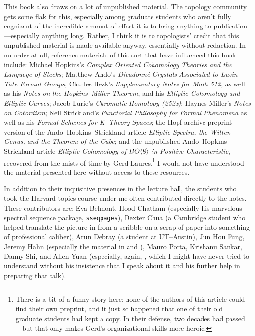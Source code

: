 This book also draws on a lot of unpublished material.  The topology community gets some flak for this, especially among graduate students who aren't fully cognizant of the incredible amount of effort it is to bring anything to publication---especially anything long.  Rather, I think it is to topologists' credit that this unpublished material is made available anyway, essentially without redaction.  In no order at all, reference materials of this sort that have influenced this book include: Michael Hopkins's \textit{Complex Oriented Cohomology Theories and the Language of Stacks}; Matthew Ando's \textit{Dieudonn\'e Crystals Associated to Lubin--Tate Formal Groups}; Charles Rezk's \textit{Supplementary Notes for Math 512}, as well as his \textit{Notes on the Hopkins--Miller Theorem}, and his \textit{Elliptic Cohomology and Elliptic Curves}; Jacob Lurie's \textit{Chromatic Homotopy (252x)}; Haynes Miller's \textit{Notes on Cobordism}; Neil Strickland's \textit{Functorial Philosophy for Formal Phenomena} as well as his \textit{Formal Schemes for $K$--Theory Spaces}; the Hopf archive preprint version of the Ando--Hopkins--Strickland article \textit{Elliptic Spectra, the Witten Genus, and the Theorem of the Cube}; and the unpublished Ando--Hopkins--Strickland article \textit{Elliptic Cohomology of $BO\langle8\rangle$ in Positive Characteristic}, recovered from the mists of time by Gerd Laures.\footnote{There is a bit of a funny story here: none of the authors of this article could find their own preprint, and it just so happened that one of their old graduate students had kept a copy.  In their defense, two decades had passed---but that only makes Gerd's organizational skills more heroic.}  I would not have understood the material presented here without access to these resources.

In addition to their inquisitive presences in the lecture hall, the students who took the Harvard topics course under me often contributed directly to the notes.  These contributors are: Eva Belmont, Hood Chatham (especially his marvelous spectral sequence package, \texttt{sseqpages}), Dexter Chua (a Cambridge student who helped translate the picture in  from a scribble on a scrap of paper into something of professional caliber), Arun Debray (a student at UT--Austin), Jun Hou Fung, Jeremy Hahn (especially the material in  and ), Mauro Porta, Krishanu Sankar, Danny Shi, and Allen Yuan (especially, again, , which I might have never tried to understand without his insistence that I speak about it and his further help in preparing that talk).

